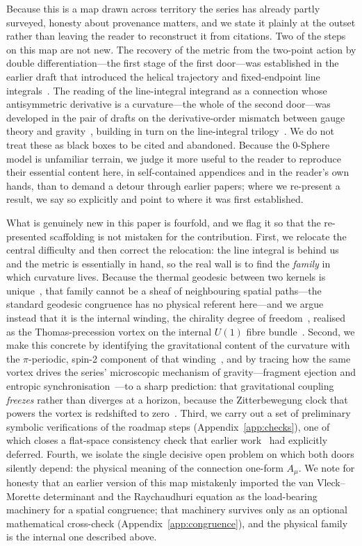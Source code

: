 \documentclass[%
 reprint, amsmath,amssymb, aps, prb, ]{revtex4-2}
\numberwithin{equation}{section}
\begin{document}
Because this is a map drawn across territory the series has already partly surveyed, honesty about provenance matters, and we state it plainly at the outset rather than leaving the reader to reconstruct it from citations. Two of the steps on this map are not new. The recovery of the metric from the two-point action by double differentiation---the first stage of the first door---was established in the earlier draft that introduced the helical trajectory and fixed-endpoint line integrals~\cite{hanamura51}. The reading of the line-integral integrand as a connection whose antisymmetric derivative is a curvature---the whole of the second door---was developed in the pair of drafts on the derivative-order mismatch between gauge theory and gravity~\cite{hanamura40,hanamura41}, building in turn on the line-integral trilogy~\cite{hanamura29,hanamura30,hanamura31}. We do not treat these as black boxes to be cited and abandoned. Because the 0-Sphere model is unfamiliar terrain, we judge it more useful to the reader to reproduce their essential content here, in self-contained appendices and in the reader's own hands, than to demand a detour through earlier papers; where we re-present a result, we say so explicitly and point to where it was first established.

What is genuinely new in this paper is fourfold, and we flag it so that the re-presented scaffolding is not mistaken for the contribution. First, we relocate the central difficulty and then correct the relocation: the line integral is behind us and the metric is essentially in hand, so the real wall is to find the \emph{family} in which curvature lives. Because the thermal geodesic between two kernels is unique~\cite{hanamura51}, that family cannot be a sheaf of neighbouring spatial paths---the standard geodesic congruence has no physical referent here---and we argue instead that it is the internal winding, the chirality degree of freedom~\cite{hanamura50}, realised as the Thomas-precession vortex on the internal $U(1)$ fibre bundle~\cite{hanamura48}. Second, we make this concrete by identifying the gravitational content of the curvature with the $\pi$-periodic, spin-2 component of that winding~\cite{hanamura48}, and by tracing how the same vortex drives the series' microscopic mechanism of gravity---fragment ejection and entropic synchronisation~\cite{hanamura49,hanamura34}---to a sharp prediction: that gravitational coupling \emph{freezes} rather than diverges at a horizon, because the Zitterbewegung clock that powers the vortex is redshifted to zero~\cite{hanamura22}. Third, we carry out a set of preliminary symbolic verifications of the roadmap steps (Appendix~\ref{app:checks}), one of which closes a flat-space consistency check that earlier work~\cite{hanamura51} had explicitly deferred. Fourth, we isolate the single decisive open problem on which both doors silently depend: the physical meaning of the connection one-form $A_\mu$. We note for honesty that an earlier version of this map mistakenly imported the van Vleck--Morette determinant and the Raychaudhuri equation as the load-bearing machinery for a spatial congruence; that machinery survives only as an optional mathematical cross-check (Appendix~\ref{app:congruence}), and the physical family is the internal one described above.
\end{document}
